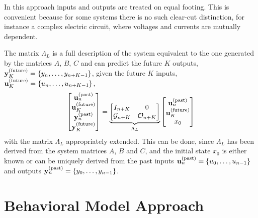 In this approach inputs and outputs are treated on equal footing. This is convenient because for some systems there is no such clear-cut distinction, for instance a complex electric circuit, where voltages and currents are mutually dependent.

The matrix $\Lambda_L$ is a full description of the system equivalent to the one generated by the matrices $A$, $B$, $C$ and can predict the future $K$ outputs, $\boldsymbol{\mathrm{y}}_K^{(\textrm{future})} = \{y_n,\ldots,y_{n+K-1}\}$, given the future $K$ inputs, $\boldsymbol{\mathrm{u}}_K^{(\textrm{future})} = \{u_n,\ldots,u_{n+K-1}\}$,
\begin{equation*}
  \begin{bmatrix}
    \boldsymbol{\mathrm{u}}_n^{(\textrm{past})} \\ \boldsymbol{\mathrm{u}}_K^{(\textrm{future})} \\ \boldsymbol{\mathrm{y}}_n^{(\textrm{past})} \\ \boldsymbol{\mathrm{y}}_K^{(\textrm{future})}
  \end{bmatrix} = \underbrace{
  \begin{bmatrix}
    I_{n+K} & 0 \\ \mathcal{G}_{n+K} & \mathcal{O}_{n+K}
  \end{bmatrix}}_{\Lambda_L}
  \begin{bmatrix}
    \boldsymbol{\mathrm{u}}_n^{(\textrm{past})} \\ \boldsymbol{\mathrm{u}}_K^{(\textrm{future})} \\ x_0
  \end{bmatrix}
\end{equation*}
with the matrix $\Lambda_L$ appropriately extended. This can be done, since $\Lambda_L$ has been derived from the system matrices $A$, $B$ and $C$, and the initial state $x_0$ is either known or can be uniquely derived from the past inputs $\boldsymbol{\mathrm{u}}_n^{(\textrm{past})} = \{u_0,\ldots,u_{n-1}\}$ and outputs $\boldsymbol{\mathrm{y}}_n^{(\textrm{past})} = \{y_0,\ldots,y_{n-1}\}$.

\section{Behavioral Model Approach}
\label{sec:behavioral-model-approach}

